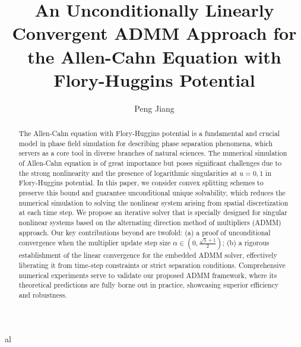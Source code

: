 \documentclass{mcom-l}
\theoremstyle{definition}
\theoremstyle{remark}
\numberwithin{equation}{section}
\begin{document}
\title[An Unconditionally Linearly Convergent ADMM Approach for the Allen-Cahn Equation with Flory-Huggins Potential]
{An Unconditionally Linearly Convergent ADMM Approach for the Allen-Cahn Equation with Flory-Huggins Potential}

al

\author{Peng Jiang}
\address{School of Mathematical Sciences,
Peking University, Beijing, China}
\curraddr{}






\dedicatory{}

\date{}




\begin{abstract}
The Allen-Cahn equation with Flory-Huggins potential is a fundamental and crucial model in phase field simulation for describing phase separation phenomena, 
which servers as a core tool in diverse branches of natural sciences. 
The numerical simulation of Allen-Cahn equation is of great importance but poses significant challenges due to the strong nonlinearity and the presence of logarithmic singularities at $u=0,1$ in Flory-Huggins potential. 
In this paper, we consider convex splitting schemes to preserve this bound and guarantee unconditional unique solvability, 
which reduces the numerical simulation to solving the nonlinear system arising from spatial discretization at each time step. 
We propose an iterative solver that is specially designed for singular nonlinear systems based on the alternating direction method of multipliers (ADMM) approach. 
Our key contributions beyond \cite{li2025overcoming} are twofold: (a) a proof of unconditional convergence when the multiplier update step size $\alpha \in (0,\frac{\sqrt{5}+1}{2})$; 
(b) a rigorous establishment of the linear convergence for the embedded ADMM solver, 
effectively liberating it from time-step constraints or strict separation conditions. 
Comprehensive numerical experiments serve to validate our proposed ADMM framework, where its theoretical predictions are fully borne out in practice, 
showcasing superior efficiency and robustness.

\end{abstract}
\end{document}
